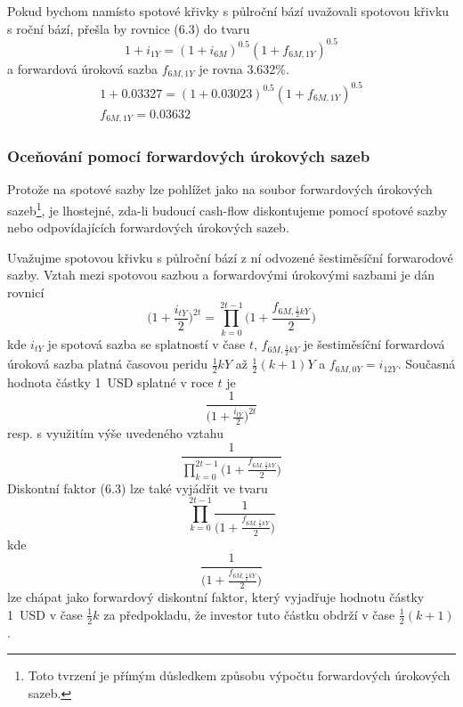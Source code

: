 \documentclass[a4paper]{book}
\begin{document}
Pokud bychom namísto spotové křivky s půlroční bází uvažovali spotovou křivku s roční bází, přešla by rovnice (6.3) do tvaru
\begin{equation*}
1 + i_{1Y} = (1 + i_{6M})^{0.5} (1 + f_{6M,1Y})^{0.5} 
\end{equation*}
a forwardová úroková sazba $f_{6M,1Y}$ je rovna 3.632\%.
\begin{gather*}
1 + 0.03327 = (1 + 0.03023)^{0.5} (1 + f_{6M,1Y})^{0.5}\\
f_{6M,1Y} = 0.03632
\end{gather*}

\subsubsection{Oceňování pomocí forwardových úrokových sazeb}

Protože na spotové sazby lze pohlížet jako na soubor forwardových úrokových sazeb\footnote{Toto tvrzení je přímým důsledkem způsobu výpočtu forwardových úrokových sazeb.}, je lhostejné, zda-li budoucí cash-flow diskontujeme pomocí spotové sazby nebo odpovídajících forwardových úrokových sazeb.

Uvažujme spotovou křivku s půlroční bází z ní odvozené šestiměsíční forwarodové sazby. Vztah mezi spotovou sazbou a forwardovými úrokovými sazbami je dán rovnicí
\begin{equation*}
\Bigg(1 + \frac{i_{tY}}{2} \Bigg)^{2t} = \prod_{k = 0}^{2t-1} \Bigg(1 + \frac{f_{6M, \frac{1}{2}kY}}{2} \Bigg)
\end{equation*}
kde $i_{tY}$ je spotová sazba se splatností v čase $t$, $f_{6M,\frac{1}{2}kY}$ je šestiměsíční forwardová úroková sazba platná časovou peridu $\frac{1}{2}kY$ až $\frac{1}{2}(k + 1)Y$ a $f_{6M,0Y} = i_{{1}{2}Y}$. Současná hodnota částky 1~USD splatné v roce $t$ je
\begin{equation*}
\frac{1}{\Big(1 + \frac{i_{tY}}{2} \Big)^{2t}}
\end{equation*}
resp. s využitím výše uvedeného vztahu
\begin{equation}
\frac{1}{\prod_{k = 0}^{2t-1} \big(1 + \frac{f_{6M, \frac{1}{2}kY}}{2} \big)}
\end{equation}
Diskontní faktor (6.3) lze také vyjádřit ve tvaru
\begin{equation*}
\prod_{k = 0}^{2t-1} \frac{1}{\big(1 + \frac{f_{6M, \frac{1}{2}kY}}{2} \big)}
\end{equation*}
kde
\begin{equation*}
\frac{1}{\big(1 + \frac{f_{6M, \frac{1}{2}kY}}{2} \big)}
\end{equation*}
lze chápat jako forwardový diskontní faktor, který vyjadřuje hodnotu částky 1~USD v čase $\frac{1}{2}k$ za předpokladu, že investor tuto částku obdrží v čase $\frac{1}{2}(k+1)$.
\end{document}

